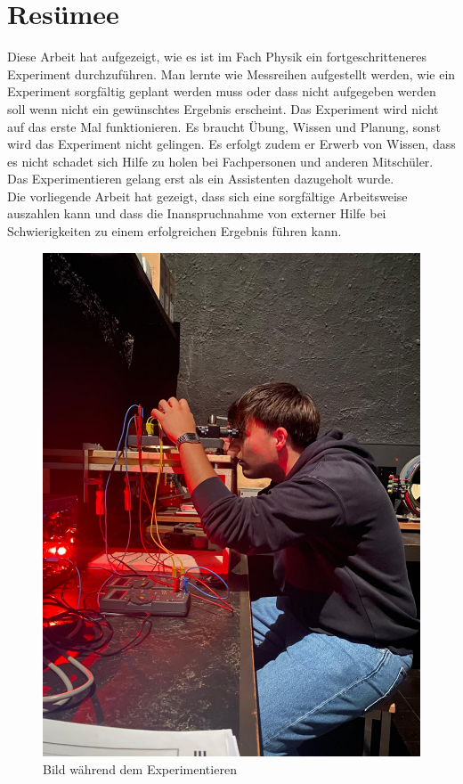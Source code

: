 \section{Resümee}\label{sec:resumee}
Diese Arbeit hat aufgezeigt, wie es ist im Fach Physik ein fortgeschritteneres Experiment durchzuführen. Man lernte wie Messreihen aufgestellt werden, wie ein Experiment sorgfältig geplant werden muss oder dass nicht aufgegeben werden soll wenn nicht ein gewünschtes Ergebnis erscheint. Das Experiment wird nicht auf das erste Mal funktionieren. Es braucht Übung, Wissen und Planung, sonst wird das Experiment nicht gelingen. Es erfolgt zudem er Erwerb von Wissen, dass es nicht schadet sich Hilfe zu holen bei Fachpersonen und anderen Mitschüler. Das Experimentieren gelang erst als ein Assistenten dazugeholt wurde. \\

\noindent Die vorliegende Arbeit hat gezeigt, dass sich eine sorgfältige Arbeitsweise auszahlen kann und dass die Inanspruchnahme von externer Hilfe bei Schwierigkeiten zu einem erfolgreichen Ergebnis führen kann.

\begin{figure}[h]
	\centering
	\includegraphics[scale=0.25]{bilder/pdf/bildExperimentieren.pdf}
	\caption{Bild während dem Experimentieren}
	\label{fig:experimentieren}
\end{figure}